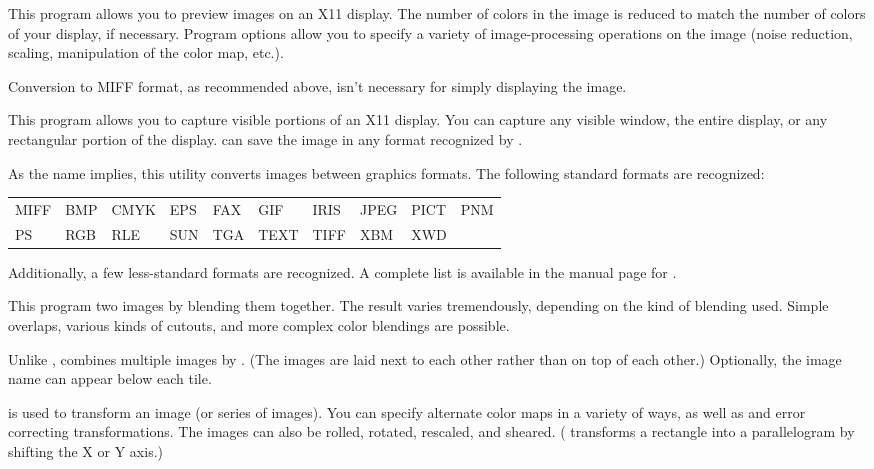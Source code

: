   \begin{iplist}{.25in} 

      This program allows 
      you to preview images on an 
      X11 display.  The number of colors in the image is reduced to 
      match the number of colors of your display, if necessary.  
      Program options allow you to specify a variety of image-processing
      operations on the image (noise reduction, scaling, manipulation
      of the color map, etc.).

      Conversion to MIFF format, as recommended above, isn't necessary
      for simply displaying the image.


      This program allows 
      you to capture visible portions of an X11
      display.  You can capture any visible window, the entire display,
      or any rectangular portion of the display.   can
      save the image in any format recognized by .


      As the name implies, this utility converts images between graphics
      formats.  The following standard formats are recognized: 

      \begin{tabular}{llllllllll}
      MIFF & BMP & CMYK & EPS & FAX & GIF  & IRIS & JPEG & PICT & PNM \\
      PS   & RGB & RLE  & SUN & TGA & TEXT & TIFF & XBM  & XWD  &
      \end{tabular}

      Additionally, a few less-standard formats are recognized.  A 
      complete list is available in the manual page for .  

    
      This program 
      two images by blending them together.  The
      result varies tremendously, depending on the kind of blending
      used.  Simple overlaps, various kinds of cutouts, and more complex
      color blendings are possible.

    
      Unlike ,  combines multiple images
      by \emph{}.  (The images are laid next to each other rather than
      on top of each other.)  Optionally, the image name can appear below 
      each tile.
      

       is 
      used to transform an image (or series of
      images).  You can specify alternate color maps in a variety
      of ways, as well as  and error correcting transformations.
      The images can also be rolled, rotated, rescaled, and sheared.
      ( transforms a rectangle into a parallelogram by 
      shifting the X or Y axis.)
  \end{iplist}
